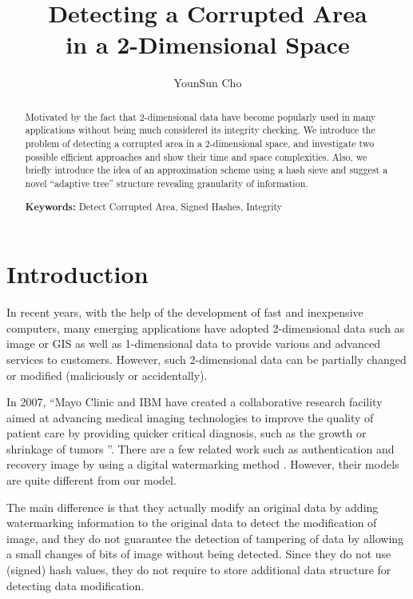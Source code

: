 \documentclass{llncs}
\begin{document}
\title{Detecting a Corrupted Area \\ in a 2-Dimensional Space}

\author{YounSun Cho}


\maketitle

\begin{abstract}
\medskip
Motivated by the fact that 2-dimensional data have become popularly used 
in many applications without being much considered its integrity checking.
We introduce the problem of 
detecting a corrupted area in a 2-dimensional space, and
investigate two possible efficient approaches
and show their time and space complexities. 
Also, we briefly introduce the idea of an approximation scheme using
a hash sieve and suggest a novel ``adaptive tree'' structure
revealing granularity of information.

{\bf Keywords:} Detect Corrupted Area, Signed Hashes, Integrity
\end{abstract}

\section{Introduction}
In recent years, with the help of the development of fast and inexpensive computers, 
many emerging applications have adopted 2-dimensional data such as image or GIS
as well as 1-dimensional data to provide various and advanced services to customers.   
However, such 2-dimensional data can be partially changed or modified (maliciously or accidentally).

In 2007, ``Mayo Clinic and IBM have created a collaborative research facility aimed at 
advancing medical imaging technologies to improve the quality of patient care 
by providing quicker critical diagnosis, such as the growth or shrinkage of tumors \cite{IBM07}''.
There are a few related work such as authentication and recovery image  
by using a digital watermarking method \cite{ZaMu07}.
However, their models are quite different from our model. 

The main difference is that they actually modify an original data 
by adding watermarking information to the original data to detect the modification of image, 
and they do not guarantee the detection of tampering of data 
by allowing a small changes of bits of image without being detected.
Since they do not use (signed) hash values, they do not require to store additional data structure
for detecting data modification.
\end{document}
